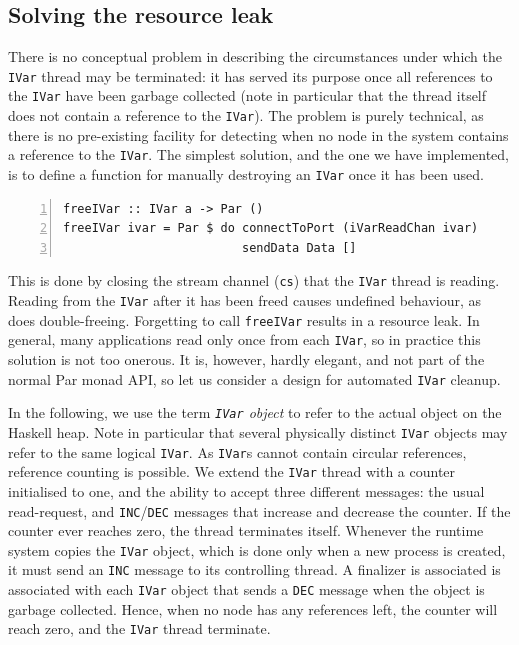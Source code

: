 \documentclass[a4paper, oneside, final]{memoir}
\begin{document}
\subsection{Solving the resource leak}

There is no conceptual problem in describing the circumstances under
which the \texttt{IVar} thread may be terminated: it has served its
purpose once all references to the \texttt{IVar} have been garbage
collected (note in particular that the thread itself does not contain
a reference to the \texttt{IVar}).  The problem is purely technical,
as there is no pre-existing facility for detecting when no node in the
system contains a reference to the \texttt{IVar}.  The simplest
solution, and the one we have implemented, is to define a function for
manually destroying an \texttt{IVar} once it has been used.

\begin{lstlisting}[numbers=left, numberstyle=\tiny]
freeIVar :: IVar a -> Par ()
freeIVar ivar = Par $ do connectToPort (iVarReadChan ivar)
                         sendData Data []
\end{lstlisting}

This is done by closing the stream channel (\texttt{cs}) that the
\texttt{IVar} thread is reading.  Reading from the \texttt{IVar} after
it has been freed causes undefined behaviour, as does double-freeing.
Forgetting to call \texttt{freeIVar} results in a resource leak.  In
general, many applications read only once from each \texttt{IVar}, so
in practice this solution is not too onerous.  It is, however, hardly
elegant, and not part of the normal Par monad API, so let us consider
a design for automated \texttt{IVar} cleanup.

In the following, we use the term \textit{\texttt{IVar} object} to
refer to the actual object on the Haskell heap.  Note in particular
that several physically distinct \texttt{IVar} objects may refer to
the same logical \texttt{IVar}.  As \texttt{IVar}s cannot contain
circular references, reference counting is possible.  We extend the
\texttt{IVar} thread with a counter initialised to one, and the
ability to accept three different messages: the usual read-request,
and \texttt{INC}/\texttt{DEC} messages that increase and decrease the
counter.  If the counter ever reaches zero, the thread terminates
itself.  Whenever the runtime system copies the \texttt{IVar} object,
which is done only when a new process is created, it must send an
\texttt{INC} message to its controlling thread.  A finalizer is
associated is associated with each \texttt{IVar} object that sends a
\texttt{DEC} message when the object is garbage collected.  Hence,
when no node has any references left, the counter will reach zero, and
the \texttt{IVar} thread terminate.
\end{document}
